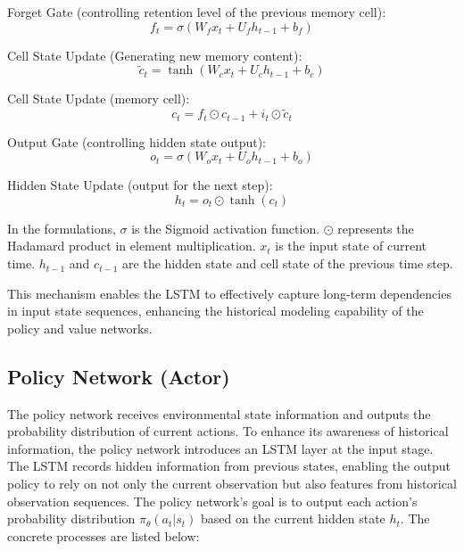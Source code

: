 Forget Gate (controlling retention level of the previous memory cell):
\begin{equation}
f_t = \sigma(W_f x_t + U_f h_{t-1} + b_f)
\end{equation}

Cell State Update (Generating new memory content):
\begin{equation}
\tilde{c}_t = \tanh(W_c x_t + U_c h_{t-1} + b_c)
\end{equation}

Cell State Update (memory cell):
\begin{equation}
c_t = f_t \odot c_{t-1} + i_t \odot \tilde{c}_t
\end{equation}

Output Gate (controlling hidden state output):
\begin{equation}
o_t = \sigma(W_o x_t + U_o h_{t-1} + b_o)
\end{equation}

Hidden State Update (output for the next step):
\begin{equation}
h_t = o_t \odot \tanh(c_t)
\end{equation}

In the formulations, $\sigma$ is the Sigmoid activation function. $\odot$ represents the Hadamard product in element multiplication. $x_t$ is the input state of current time. $h_{t-1}$ and $c_{t-1}$ are the hidden state and cell state of the previous time step.

This mechanism enables the LSTM to effectively capture long-term dependencies in input state sequences, enhancing the historical modeling capability of the policy and value networks.

\subsection{Policy Network (Actor)}

The policy network receives environmental state information and outputs the probability distribution of current actions. To enhance its awareness of historical information, the policy network introduces an LSTM layer at the input stage. The LSTM records hidden information from previous states, enabling the output policy to rely on not only the current observation but also features from historical observation sequences. The policy network's goal is to output each action's probability distribution $\pi_{\theta}(a_{t}|s_{t})$ based on the current hidden state $h_{t}$. The concrete processes are listed below:

